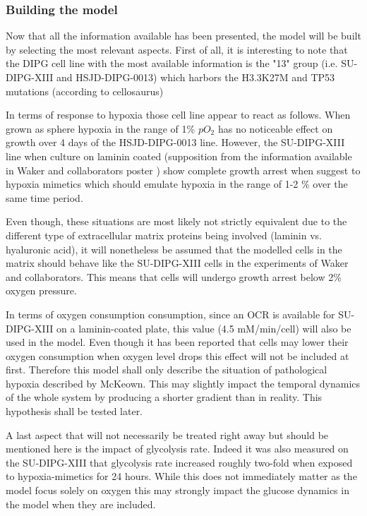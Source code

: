 \documentclass[11pt,a4paper]{article}
\begin{document}
\subsubsection{Building the model}
Now that all the information available has been presented, the model will be built by selecting the most relevant aspects. First of all, it is interesting to note that the DIPG cell line with the most available information is the "13" group (i.e. SU-DIPG-XIII and HSJD-DIPG-0013) which harbors the H3.3K27M and TP53 mutations (according to cellosaurus) 

In terms of response to hypoxia those cell line appear  to react as follows. When grown as sphere hypoxia in the range of 1\% $pO_2$ has no noticeable effect on growth over 4 days of the HSJD-DIPG-0013 line. However, the SU-DIPG-XIII line when culture on laminin coated (supposition from the information available in Waker and collaborators poster \cite{Waker2018}) show complete growth arrest when suggest to hypoxia mimetics which should emulate hypoxia in the range of 1-2 \% over the same time period. 

Even though, these situations are most likely not strictly equivalent due to the different type of extracellular matrix proteins being involved (laminin vs. hyaluronic acid), it will nonetheless be assumed that the modelled cells in the matrix should behave like the SU-DIPG-XIII cells in the experiments of Waker and collaborators. This means that cells will undergo growth arrest  below 2\% oxygen pressure.

In terms of oxygen consumption consumption, since an OCR is available for SU-DIPG-XIII on a laminin-coated plate, this value (4.5 mM/min/cell) will also be used in the model. Even though it has been reported that cells may lower their oxygen consumption when oxygen level drops this effect will not be included at first. Therefore this model shall only describe the situation of pathological hypoxia described by McKeown. This may slightly impact the temporal dynamics of the whole system by producing a shorter gradient than in reality. This hypothesis shall be tested later.

A last aspect that will not necessarily be treated right away but should be mentioned here is the impact of glycolysis rate. Indeed it was also measured  on the SU-DIPG-XIII that glycolysis rate increased roughly two-fold when exposed to hypoxia-mimetics for 24 hours. While this does not immediately matter as the model focus solely on oxygen this may strongly impact the glucose dynamics in the model when they are included.
\end{document}
